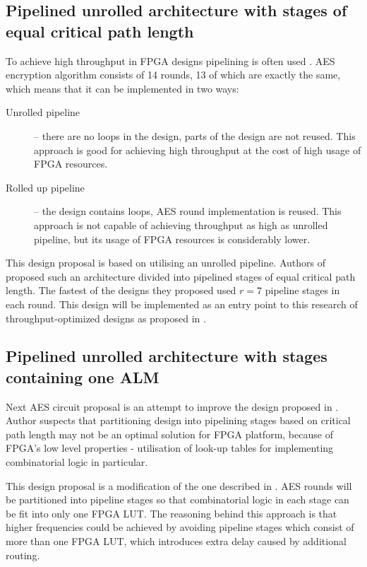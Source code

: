 
\subsection{Pipelined unrolled architecture with stages of equal critical path length}
To achieve high throughput in FPGA designs pipelining is often used \cite[Chapter 1]{kilts2007advanced}. AES encryption algorithm consists of 14 rounds, 13 of which are exactly the same, which means that it can be implemented in two ways:
\begin{description}
\item[Unrolled pipeline] -- there are no loops in the design, parts of the design are not reused. This approach is good for achieving high throughput at the cost of high usage of FPGA resources.
\item[Rolled up pipeline] -- the design contains loops, AES round implementation is reused. This approach is not capable of achieving throughput as high as unrolled pipeline, but its usage of FPGA resources is considerably lower.
\end{description}

This design proposal is based on utilising an unrolled pipeline. Authors of \cite{vlsi} proposed such an architecture divided into pipelined stages of equal critical path length. The fastest of the designs they proposed \cite[Fig. 11]{vlsi} used $r=7$ pipeline stages in each round. This design will be implemented as an entry point to this research of throughput-optimized designs as proposed in \cite{vlsi}.


\subsection{Pipelined unrolled architecture with stages containing one ALM}
Next AES circuit proposal is an attempt to improve the design proposed in \cite{vlsi}. Author suspects that partitioning design into pipelining stages based on critical path length may not be an optimal solution for FPGA platform, because of FPGA's low level properties - utilisation of look-up tables for implementing combinatorial logic in particular.

This design proposal is a modification of the one described in \cite{vlsi}. AES rounds will be partitioned into pipeline stages so that combinatorial logic in each stage can be fit into only one FPGA LUT. The reasoning behind this approach is that higher frequencies could be achieved by avoiding pipeline stages which consist of more than one FPGA LUT, which introduces extra delay caused by additional routing.

